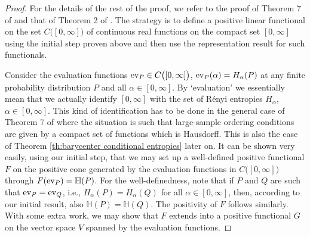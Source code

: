 \documentclass[aps,pra,11pt,onecolumn,nofootinbib,tightenlines]{revtex4-2}
\theoremstyle{definition}
\newcommand{\mb}[1]{\mathbb{#1}}
\begin{document}
\begin{proof}
    For the details of the rest of the proof, we refer to the proof of Theorem 7 of \cite{haapasalo_inprep} and that of Theorem 2 of \cite{mu21_renyi}. The strategy is to define a positive linear functional on the set $C\big([0,\infty]\big)$ of continuous real functions on the compact set $[0,\infty]$ using the initial step proven above and then use the representation result for such functionals.
    
    Consider the evaluation functions ${\rm ev}_P\in C\big([0,\infty]\big)$, ${\rm ev}_P(\alpha)=H_\alpha(P)$ at any finite probability distribution $P$ and all $\alpha\in[0,\infty]$. By `evaluation' we essentially mean that we actually identify $[0,\infty]$ with the set of R\'{e}nyi entropies $H_\alpha$, $\alpha\in[0,\infty]$. This kind of identification has to be done in the general case of Theorem 7 of \cite{haapasalo_inprep} where the situation is such that large-sample ordering conditions are given by a compact set of functions which is Hausdorff. This is also the case of Theorem \ref{th:barycenter conditional entropies} later on. It can be shown very easily, using our initial step, that we may set up a well-defined positive functional $F$ on the positive cone generated by the evaluation functions in $C\big([0,\infty]\big)$ through $F({\rm ev}_P)=\mb H(P)$. For the well-definedness, note that if $P$ and $Q$ are such that ${\rm ev}_P={\rm ev}_Q$, i.e., $H_\alpha(P)=H_\alpha(Q)$ for all $\alpha\in[0,\infty]$, then, according to our initial result, also $\mb H(P)=\mb H(Q)$. The positivity of $F$ follows similarly. With some extra work, we may show that $F$ extends into a positive functional $G$ on the vector space $V$ spanned by the evaluation functions.
    

\end{proof}
\end{document}
